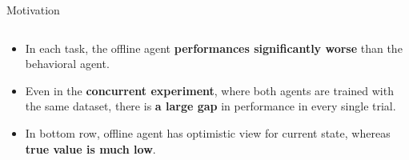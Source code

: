 \documentclass[11pt]{beamer}
\newcommand{\tb}[1]{\textbf{#1}}
\begin{document}
\begin{frame}{Motivation}
\begin{columns}
\begin{column}{0.5\textwidth}
            \begin{itemize}
                \item In each task, the offline agent \tb{performances significantly worse} than the behavioral agent.
                \item Even in the \tb{concurrent experiment}, where both agents are trained with the same dataset, there is \tb{a large gap} in performance in every single trial.
                \item In bottom row, offline agent has optimistic view for current state, whereas \tb{true value is much low}.
            \end{itemize}
        \end{column}
    \end{columns}
\end{frame}
\end{document}
